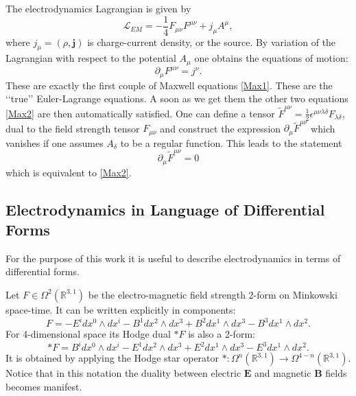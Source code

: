\documentclass[11pt]{report}
\theoremstyle{plain}
\theoremstyle{definition}
\theoremstyle{remark}
\theoremstyle{remark}
\numberwithin{equation}{section}
\begin{document}
The electrodynamics Lagrangian is given by
%
\begin{equation}
\mathcal{L}_{EM} = -\frac{1}{4} F_{\mu\nu}F^{\mu\nu} + j_{\mu}A^{\mu},
\end{equation}
%
where $j_{\mu} = (\rho, \mathbf{j})$ is charge-current density, or the source.
By variation of the Lagrangian with respect to the potential $A_\mu$ one obtains the equations of motion:
%
\begin{equation}\label{MaxGen}
\partial_{\mu}F^{\mu\nu} = j^{\nu}.
\end{equation}
%
These are exactly the first couple of Maxwell equations \eqref{Max1}. These are the \lq\lq{}true\rq\rq{} Euler-Lagrange equations. A soon as we get them the other two equations \eqref{Max2} are then automatically satisfied. One can define a tensor $\tilde{F}^{\mu\nu} = \frac{1}{2}\epsilon^{\mu\nu\lambda\delta}F_{\lambda\delta}$, dual to the field strength tensor $F_{\mu\nu}$ and construct the expression $\partial_{\mu}\tilde{F}^{\mu\nu}$ which vanishes if one assumes $A_{\delta}$ to be a regular function. %
This leads to the statement
%
\begin{equation}\label{MaxCov2}
\partial_{\mu}\tilde{F}^{\mu\nu}=0
\end{equation}
%
which is equivalent to \eqref{Max2}. 



\subsection{Electrodynamics in Language of Differential Forms}
For the purpose of this work it is useful to describe electrodynamics in terms of differential forms.
 




Let $F \in \Omega^2(\mathbb{R}^{3,1})$ be the electro-magnetic field strength 2-form on Minkowski space-time. It can be written explicitly in components:
%
\begin{equation}
F = - E^idx^0\wedge dx^i - B^1dx^2\wedge dx^3 +B^2dx^1\wedge dx^3 - B^3dx^1\wedge dx^2.
\end{equation}
%
For 4-dimensional space its Hodge dual $\ast F$ is also a 2-form:
%
\begin{equation}
\ast F = B^idx^0\wedge dx^i-E^1 dx^2\wedge dx^3 +E^2 dx^1\wedge dx^3 -E^3dx^1\wedge dx^2.
\end{equation}
It is obtained by applying the Hodge star operator $\ast : \Omega^n(\mathbb{R}^{3,1})\to \Omega^{4-n}(\mathbb{R}^{3,1})$. Notice that in this notation the duality between electric $\mathbf{E}$ and magnetic $\mathbf{B}$ fields becomes manifest. 
\end{document}
